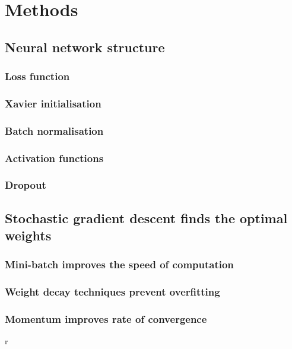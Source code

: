 \section{Methods \label{chapter2}}
\subsection{Neural network structure}
\subsubsection{Loss function}
\subsubsection{Xavier initialisation}
\subsubsection{Batch normalisation}
\subsubsection{Activation functions}
\subsubsection{Dropout}
\subsection{Stochastic gradient descent finds the optimal weights}
\subsubsection{Mini-batch improves the speed of computation}
\subsubsection{Weight decay techniques prevent overfitting}
\subsubsection{Momentum improves rate of convergence}

r